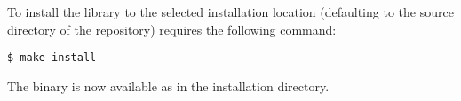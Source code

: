 To install the library to the selected installation location (defaulting to the source directory of the repository) requires the following command:
\begin{verbatim}
$ make install
\end{verbatim}

The binary is now available as  in the installation directory.

